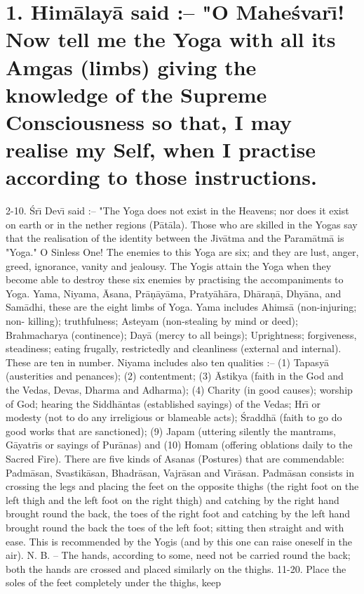 \chapter{1. Him\=alay\=a said :-- "O Mahe\'svar\={\i}! Now tell me the Yoga with all its Amgas (limbs) giving the knowledge of the Supreme Consciousness so that, I may realise my Self, when I practise according to those instructions.}
2-10. \'Sr\={\i} Dev\={\i} said :-- "The Yoga does not exist in the Heavens; nor does it exist on earth or in the nether regions (P\=at\=ala). Those who are skilled in the Yogas say that the realisation of the identity between the Jiv\=atma and the Param\=atm\=a is "Yoga." O Sinless One! The enemies to this Yoga are six; and they are lust, anger, greed, ignorance, vanity and jealousy. The Yogis attain the Yoga when they become able to destroy these six enemies by practising the accompaniments to Yoga. Yama, Niyama, \=Asana, Pr\=a\d{n}\=ay\=ama, Praty\=ah\=ara, Dh\=ara\d{n}\=a, Dhy\=ana, and Sam\=adhi, these are the eight limbs of Yoga. Yama includes Ahims\=a (non-injuring; non- killing); truthfulness; Asteyam (non-stealing by mind or deed); Brahmacharya (continence); Day\=a (mercy to all beings); Uprightness; forgiveness, steadiness; eating frugally, restrictedly and cleanliness (external and internal). These are ten in number. Niyama includes also ten qualities :-- (1) Tapasy\=a (austerities and penances); (2) contentment; (3) \=Astikya (faith in the God and the Vedas, Devas, Dharma and Adharma); (4) Charity (in good causes); worship of God; hearing the Siddh\=antas (established sayings) of the Vedas; Hr\={\i} or modesty (not to do any irreligious or blameable acts); \'Sraddh\=a (faith to go do good works that are sanctioned); (9) Japam (uttering silently the mantrams, G\=ayatr\={\i}s or sayings of Pur\=anas) and (10) Homam (offering oblations daily to the Sacred Fire). There are five kinds of Asanas (Postures) that are commendable: Padm\=asan, Svastik\=asan, Bhadr\=asan, Vajr\=asan and V\={\i}r\=asan. Padm\=asan consists in crossing the legs and placing the feet on the opposite thighs (the right foot on the left thigh and the left foot on the right thigh) and catching by the right hand brought round the back, the toes of the right foot and catching by the left hand brought round the back the toes of the left foot; sitting then straight and with ease. This is recommended by the Yogis (and by this one can raise oneself in the air).
N. B. -- The hands, according to some, need not be carried round the back; both the hands are crossed and placed similarly on the thighs.
11-20. Place the soles of the feet completely under the thighs, keep

